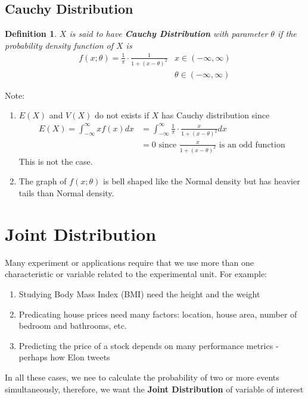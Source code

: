 \documentclass[11pt,oneside]{book}
\theoremstyle{newStyle}
\newtheorem{defn}[thm]{Definition}
\newcommand{\note}{\color{red}Note: \color{black}}
\begin{document}
\section[Cauchy Distribution]{Cauchy Distribution}
\begin{defn}
$X$ is said to have \textbf{Cauchy Distribution} with parameter $\theta$ if the probability density function of $X$ is \begin{align*}
f(x;\theta)=\frac{1}{\pi}\cdot \frac{1}{1+(x-\theta)^2}&x\in (-\infty,\infty)\\
&\theta\in (-\infty,\infty)
\end{align*}
\end{defn}
\note \begin{enumerate}
\item $E(X)$ and $V(X)$ do not exists if $X$ has Cauchy distribution since \begin{align*}
E(X)=\int_{-\infty}^{\infty}xf(x)dx&=\int_{-\infty}^{\infty}\frac{1}{\pi}\cdot \frac{x}{1+(x-\theta)^2}dx\\
&=0\text{ since } \frac{x}{1+(x-\theta)^2}\text{ is an odd function}
\end{align*}
This is not the case.
\item The graph of $f(x;\theta)$ is bell shaped like the Normal density but has heavier tails than Normal density.
\end{enumerate}
\chapter[Joint Distribution]{Joint Distribution}
Many experiment or applications require that we use more than one characteristic or variable related to the experimental unit. For example:\begin{enumerate}
\item Studying Body Mass Index (BMI) need the height and the weight
\item Predicating house prices need many factors: location, house area, number of bedroom and bathrooms, etc.
\item Predicting the price of a stock depends on many performance metrics - perhaps how Elon tweets
\end{enumerate}
In all these cases, we nee to calculate the probability of two or more events simultaneously, therefore, we want the \textbf{Joint Distribution} of variable of interest
\end{document}
